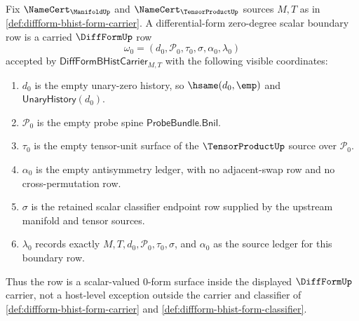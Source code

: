 \begin{definition}
\label{def:diffform-zero-degree-scalar-boundary}
Fix $\NameCert_{\ManifoldUp}$ and $\NameCert_{\TensorProductUp}$ sources
$M,T$ as in \autoref{def:diffform-bhist-form-carrier}. A differential-form
zero-degree scalar boundary row is a carried $\DiffFormUp$ row
$$
\omega_0=(d_0,\mathcal{P}_0,\tau_0,\sigma,\alpha_0,\lambda_0)
$$
accepted by $\mathsf{DiffFormBHistCarrier}_{M,T}$ with the following visible
coordinates:
\begin{enumerate}
  \item $d_0$ is the empty unary-zero history, so $\hsame(d_0,\emp)$ and
  $\mathsf{UnaryHistory}(d_0)$.
  \item $\mathcal{P}_0$ is the empty probe spine
  $\mathsf{ProbeBundle.Bnil}$.
  \item $\tau_0$ is the empty tensor-unit surface of the
  $\TensorProductUp$ source over $\mathcal{P}_0$.
  \item $\alpha_0$ is the empty antisymmetry ledger, with no adjacent-swap
  row and no cross-permutation row.
  \item $\sigma$ is the retained scalar classifier endpoint row supplied by
  the upstream manifold and tensor sources.
  \item $\lambda_0$ records exactly $M,T,d_0,\mathcal{P}_0,\tau_0,\sigma$,
  and $\alpha_0$ as the source ledger for this boundary row.
\end{enumerate}
Thus the row is a scalar-valued $0$-form surface inside the displayed
$\DiffFormUp$ carrier, not a host-level exception outside the carrier and
classifier of \autoref{def:diffform-bhist-form-carrier} and
\autoref{def:diffform-bhist-form-classifier}.
\end{definition}

